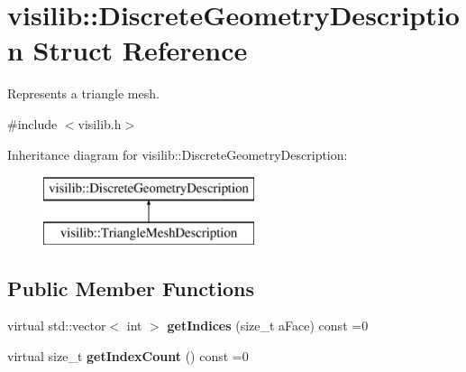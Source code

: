 \hypertarget{structvisilib_1_1_discrete_geometry_description}{}\section{visilib\+::Discrete\+Geometry\+Description Struct Reference}
\label{structvisilib_1_1_discrete_geometry_description}


Represents a triangle mesh.  




{\ttfamily \#include $<$visilib.\+h$>$}

Inheritance diagram for visilib\+::Discrete\+Geometry\+Description\+:\begin{figure}[H]
\begin{center}
\leavevmode
\includegraphics[height=2.000000cm]{structvisilib_1_1_discrete_geometry_description}
\end{center}
\end{figure}
\subsection*{Public Member Functions}
\begin{DoxyCompactItemize}
\item 
\mbox{\label{structvisilib_1_1_discrete_geometry_description_a69b9b700b3f03b54f919c4b90da51cdf}} 
virtual std\+::vector$<$ int $>$ {\bfseries get\+Indices} (size\+\_\+t a\+Face) const =0
\item 
\mbox{\label{structvisilib_1_1_discrete_geometry_description_a3a41016600ed8cd641fbbee519c17584}} 
virtual size\+\_\+t {\bfseries get\+Index\+Count} () const =0
\end{DoxyCompactItemize}
